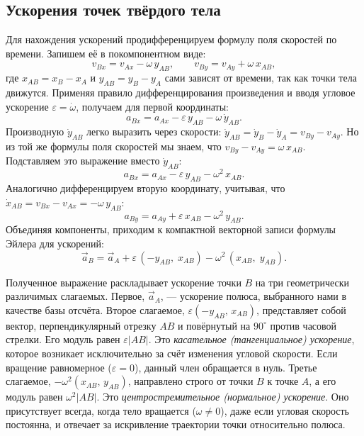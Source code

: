 \documentclass[../main.tex]{subfiles}
\begin{document}
\subsection{Ускорения точек твёрдого тела}

Для нахождения ускорений продифференцируем формулу поля скоростей по времени. Запишем её в покомпонентном виде:
\[
v_{Bx} = v_{Ax} - \omega\, y_{AB}, \qquad
v_{By} = v_{Ay} + \omega\, x_{AB},
\]
где $x_{AB} = x_B - x_A$ и $y_{AB} = y_B - y_A$ сами зависят от времени, так как точки тела движутся. Применяя правило дифференцирования произведения и вводя угловое ускорение $\varepsilon = \dot\omega$, получаем для первой координаты:
\[
a_{Bx} = a_{Ax} - \varepsilon\, y_{AB} - \omega\,\dot y_{AB}.
\]
Производную $\dot y_{AB}$ легко выразить через скорости: $\dot y_{AB} = \dot y_B - \dot y_A = v_{By} - v_{Ay}$. Но из той же формулы поля скоростей мы знаем, что $v_{By} - v_{Ay} = \omega\, x_{AB}$. Подставляем это выражение вместо $\dot y_{AB}$:
\[
a_{Bx} = a_{Ax} - \varepsilon\, y_{AB} - \omega^2\, x_{AB}.
\]
Аналогично дифференцируем вторую координату, учитывая, что $\dot x_{AB} = v_{Bx} - v_{Ax} = -\omega\, y_{AB}$:
\[
a_{By} = a_{Ay} + \varepsilon\, x_{AB} - \omega^2\, y_{AB}.
\]
Объединяя компоненты, приходим к компактной векторной записи формулы Эйлера для ускорений:
\[
\vec{a}_B = \vec{a}_A
+ \varepsilon\,(-y_{AB},\; x_{AB})
- \omega^2\,(x_{AB},\; y_{AB}).
\]

Полученное выражение раскладывает ускорение точки $B$ на три геометрически различимых слагаемых. Первое, $\vec{a}_A$, --- ускорение полюса, выбранного нами в качестве базы отсчёта. Второе слагаемое, $\varepsilon(-y_{AB},\, x_{AB})$, представляет собой вектор, перпендикулярный отрезку $AB$ и повёрнутый на $90^\circ$ против часовой стрелки. Его модуль равен $\varepsilon|AB|$. Это \textit{касательное (тангенциальное) ускорение}, которое возникает исключительно за счёт изменения угловой скорости. Если вращение равномерное ($\varepsilon = 0$), данный член обращается в нуль. Третье слагаемое, $-\omega^2(x_{AB},\, y_{AB})$, направлено строго от точки $B$ к точке $A$, а его модуль равен $\omega^2|AB|$. Это \textit{центростремительное (нормальное) ускорение}. Оно присутствует всегда, когда тело вращается ($\omega \ne 0$), даже если угловая скорость постоянна, и отвечает за искривление траектории точки относительно полюса.
\end{document}
